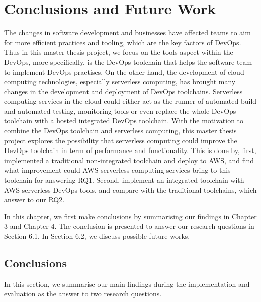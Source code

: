 \chapter{Conclusions and Future Work}
\label{chp:conclusionsandfuturework}
The changes in software development and businesses have affected teams to aim for more efficient practices and tooling, which are the key factors of DevOps. Thus in this master thesis project, we focus on the tools aspect within the DevOps, more specifically, is the DevOps toolchain that helps the software team to implement DevOps practises. On the other hand, the development of cloud computing technologies, especially serverless computing, has brought many changes in the development and deployment of DevOps toolchains. Serverless computing services in the cloud could either act as the runner of automated build and automated testing, monitoring tools or even replace the whole DevOps toolchain with a hosted integrated DevOps toolchain. With the motivation to combine the DevOps toolchain and serverless computing, this master thesis project explores the possibility that serverless computing could improve the DevOps toolchain in term of performance and functionality. 
This is done by, first, implemented a traditional non-integrated toolchain and deploy to AWS, and find what improvement could AWS serverless computing services bring to this toolchain for answering RQ1. Second, implement an integrated toolchain with AWS serverless DevOps tools, and compare with the traditional toolchains, which answer to our RQ2. 

In this chapter, we first make conclusions by summarising our findings in Chapter 3 and Chapter 4. The conclusion is presented to answer our research questions in Section 6.1. In Section 6.2, we discuss possible future works.
\section{Conclusions}
In this section, we summarise our main findings during the implementation and evaluation as the answer to two research questions.
